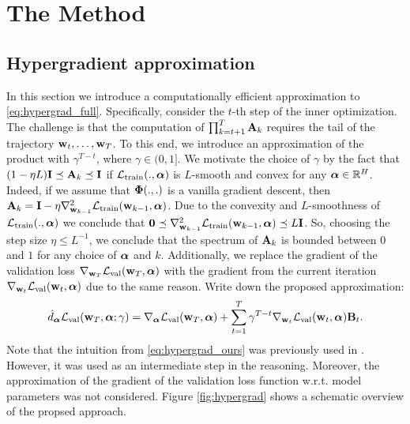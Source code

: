 \section{The Method}

\subsection{Hypergradient approximation}

In this section we introduce a computationally efficient approximation to \eqref{eq:hypergrad_full}. Specifically, consider the $t$-th step of the inner optimization. The challenge is that the computation of $\prod_{k=t+1}^T\boldsymbol{\mathbf{A}}_k$ requires the tail of the trajectory $\boldsymbol{\mathbf{w}}_t, \ldots, \boldsymbol{\mathbf{w}}_T$. To this end, we introduce an approximation of the product with $\gamma^{T - t}$, where $\gamma \in (0, 1]$.
We motivate the choice of $\gamma$ by the fact that $(1 - \eta L)\boldsymbol{\mathbf{I}} \preceq \boldsymbol{\mathbf{A}}_k\preceq \boldsymbol{\mathbf{I}}$ if $\mathcal{L}_{\mathrm{train}}(., \boldsymbol{\mathbf{\alpha}})$ is $L$-smooth and convex for any $\boldsymbol{\mathbf{\alpha}} \in \mathbb{R}^H$. Indeed, if we assume that $\boldsymbol{\mathbf{\Phi}}(., .)$ is a vanilla gradient descent, then $\boldsymbol{\mathbf{A}}_k = \boldsymbol{\mathbf{I}} - \eta\nabla^2_{\boldsymbol{\mathbf{w}}_{k-1}}\mathcal{L}_{\mathrm{train}}(\boldsymbol{\mathbf{w}}_{k-1}, \boldsymbol{\mathbf{\alpha}})$. Due to the convexity and $L$-smoothness of $\mathcal{L}_{\mathrm{train}}(., \boldsymbol{\mathbf{\alpha}})$ we conclude that $\boldsymbol{\mathbf{0}} \preceq \nabla^2_{\boldsymbol{\mathbf{w}}_{k-1}}\mathcal{L}_{\mathrm{train}}(\boldsymbol{\mathbf{w}}_{k-1}, \boldsymbol{\mathbf{\alpha}}) \preceq L\boldsymbol{\mathbf{I}}$. So, choosing the step size $\eta \leq L^{-1}$, we conclude that the spectrum of $\boldsymbol{\mathbf{A}}_k$ is bounded between $0$ and $1$ for any choice of $\boldsymbol{\mathbf{\alpha}}$ and $k$. Additionally, we replace the gradient of the validation loss $\nabla_{\boldsymbol{\mathbf{w}}_T}\mathcal{L}_\text{val}(\boldsymbol{\mathbf{w}}_T, \boldsymbol{\mathbf{\alpha}})$ with the gradient from the current iteration $\nabla_{\boldsymbol{\mathbf{w}}_t}\mathcal{L}_\text{val}(\boldsymbol{\mathbf{w}}_t, \boldsymbol{\mathbf{\alpha}})$ due to the same reason. Write down the proposed approximation:
\begin{align}\label{eq:hypergrad_ours}
    \hat{d}_{\boldsymbol{\mathbf{\alpha}}}\mathcal{L}_\text{val}(\boldsymbol{\mathbf{w}}_T, \boldsymbol{\mathbf{\alpha}}; \gamma) = \nabla_{\boldsymbol{\mathbf{\alpha}}}\mathcal{L}_\text{val}(\boldsymbol{\mathbf{w}}_T, \boldsymbol{\mathbf{\alpha}}) + \sum_{t=1}^T\gamma^{T-t}\nabla_{\boldsymbol{\mathbf{w}}_t}\mathcal{L}_\text{val}(\boldsymbol{\mathbf{w}}_t, \boldsymbol{\mathbf{\alpha}})\boldsymbol{\mathbf{B}}_t.
\end{align}
Note that the intuition from \eqref{eq:hypergrad_ours} was previously used in \cite{lee2021online}. However, it was used as an intermediate step in the reasoning. Moreover, the approximation of the gradient of the validation loss function w.r.t. model parameters was not considered. Figure \ref{fig:hypergrad} shows a schematic overview of the propsed approach.


